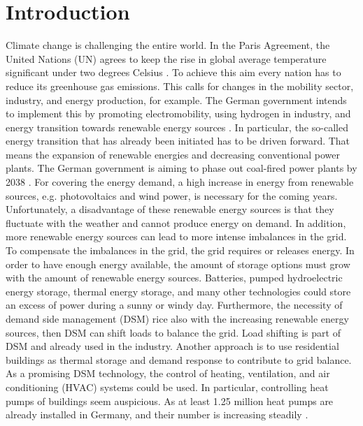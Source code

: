 \chapter{Introduction}
\label{ch:introduction}
Climate change is challenging the entire world. In the Paris Agreement, the United Nations (UN)  agrees to keep the rise in global average temperature significant under two degrees Celsius \cite{UnitedNations.2015}. To achieve this aim every nation has to reduce its greenhouse gas emissions. This calls for changes in the mobility sector, industry, and energy production, for example. The German government intends to implement this by promoting electromobility, using hydrogen in industry, and energy transition towards renewable energy sources \cite{Deutschlandfunk.24.06.2021}. In particular, the so-called energy transition that has already been initiated has to be driven forward. That means the expansion of renewable energies and decreasing conventional power plants. The German government is aiming to phase out coal-fired power plants by 2038 \cite{bundesregierung.2021}. For covering the energy demand, a high increase in energy from renewable sources, e.g. photovoltaics and wind power, is necessary for the coming years. 
\newline
Unfortunately, a disadvantage of these renewable energy sources is that they fluctuate with the weather and cannot produce energy on demand. In addition, more renewable energy sources can lead to more intense imbalances in the grid.
To compensate the imbalances in the grid, the grid requires or releases energy. In order to have enough energy available, the amount of storage options must grow with the amount of renewable energy sources. Batteries, pumped hydroelectric energy storage, thermal energy storage, and many other technologies could store an excess of power during a sunny or windy day. Furthermore, the necessity of demand side management (DSM)  rice also with the increasing renewable energy sources, then DSM can shift loads to balance the grid. Load shifting is part of DSM \cite{Gellings.1985} and already used in the industry. Another approach is to use residential buildings as thermal storage and demand response to contribute to grid balance\cite{Kohlhepp.2017}. As a promising DSM technology, the control of heating, ventilation, and air conditioning (HVAC) systems could be used. In particular, controlling heat pumps of buildings seem auspicious. As at least 1.25 million heat pumps are already installed in Germany, and their number is increasing steadily \cite{BMW.2021}.
